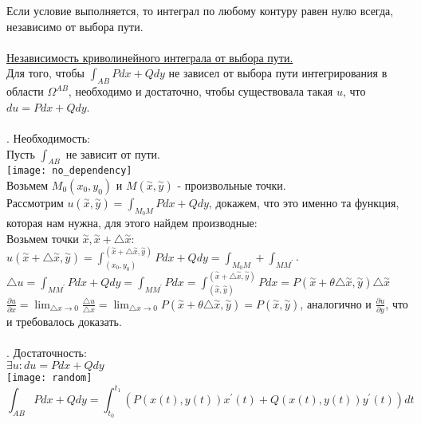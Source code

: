 \documentclass[12pt]{article}
\begin{document}
Если условие выполняется, то интеграл по любому контуру равен нулю всегда, независимо от выбора пути.\\
\\
\label{question29_3}\uline{Независимость криволинейного интеграла от выбора пути.}\\
Для того, чтобы $\int_{AB} Pdx + Qdy$ не зависел от выбора пути интегрирования в области $\Omega^{AB}$, необходимо и достаточно, чтобы существовала такая $u$, что $du = Pdx + Qdy$.\\
\\
. Необходимость:\\
Пусть $\int_{AB}$ не зависит от пути.\\
\texttt{[image: no\_dependency]}\\
Возьмем $M_0(x_0,y_0)$ и $M(\overset{\sim}{x},\overset{\sim}{y})$ - произвольные точки. \\Рассмотрим $u(\overset{\sim}{x},\overset{\sim}{y}) = \int_{M_0 M} Pdx+Qdy$, докажем, что это именно та функция, которая нам нужна, для этого найдем производные:\\
Возьмем точки $\overset{\sim}{x}, \overset{\sim}{x}+{\bigtriangleup \overset{\sim}{x}}:$\\ 
$u(\overset{\sim}{x}+{\bigtriangleup \overset{\sim}{x}}, \overset{\sim}{y}) = \int_{(x_0,y_0)}^{(\overset{\sim}{x}+{\bigtriangleup \overset{\sim}{x}},\overset{\sim}{y})} Pdx + Qdy = \int_{M_0 M} + \int_{M M^{'}}$.\\
${\bigtriangleup u} = \int_{M M^{'}} Pdx + Qdy = \int_{M M^{'}} Pdx = \int_{(\overset{\sim}{x},\overset{\sim}{y})}^{(\overset{\sim}{x}+{\bigtriangleup \overset{\sim}{x}},\overset{\sim}{y})} Pdx=P(\overset{\sim}{x}+\theta {\bigtriangleup \overset{\sim}{x}},\overset{\sim}{y}){\bigtriangleup \overset{\sim}{x}}$\\
$\frac{\partial u}{\partial x} = \lim_{{\bigtriangleup x}\to 0} \frac{{\bigtriangleup u}}{{\bigtriangleup x}}=\lim_{{\bigtriangleup x}\to 0} P(\overset{\sim}{x}+\theta {\bigtriangleup \overset{\sim}{x}},\overset{\sim}{y}) = P(\overset{\sim}{x},\overset{\sim}{y})$, аналогично и $\frac{\partial u}{\partial y}$, что и требовалось доказать.\\
\\
. Достаточность:\\
$\exists u : du = Pdx + Qdy$\\
\texttt{[image: random]}\\
$$\int_{AB} Pdx + Qdy = \int_{t_0}^{t_1} (P(x(t),y(t))x^{'}(t)+Q(x(t),y(t))y^{'}(t))dt$$
\end{document}
